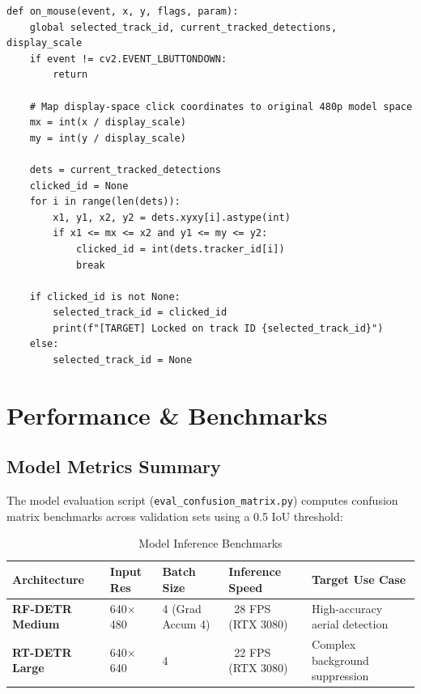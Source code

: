 \documentclass[11pt,a4paper]{article}
\begin{document}
\begin{lstlisting}[caption={Interactive Target Selection Callback (\texttt{demo.py})}]
def on_mouse(event, x, y, flags, param):
    global selected_track_id, current_tracked_detections, display_scale
    if event != cv2.EVENT_LBUTTONDOWN:
        return

    # Map display-space click coordinates to original 480p model space
    mx = int(x / display_scale)
    my = int(y / display_scale)

    dets = current_tracked_detections
    clicked_id = None
    for i in range(len(dets)):
        x1, y1, x2, y2 = dets.xyxy[i].astype(int)
        if x1 <= mx <= x2 and y1 <= my <= y2:
            clicked_id = int(dets.tracker_id[i])
            break

    if clicked_id is not None:
        selected_track_id = clicked_id
        print(f"[TARGET] Locked on track ID {selected_track_id}")
    else:
        selected_track_id = None
\end{lstlisting}

\newpage

\section{Performance \& Benchmarks}

\subsection{Model Metrics Summary}
The model evaluation script (\texttt{eval\_confusion\_matrix.py}) computes confusion matrix benchmarks across validation sets using a 0.5 IoU threshold:

\begin{table}[H]
    \centering
    \begin{tabular}{@{}lllll@{}}
        \toprule
        \textbf{Architecture} & \textbf{Input Res} & \textbf{Batch Size} & \textbf{Inference Speed} & \textbf{Target Use Case} \\
        \midrule
        \textbf{RF-DETR Medium} & 640$\times$480 & 4 (Grad Accum 4) & ~28 FPS (RTX 3080) & High-accuracy aerial detection \\
        \textbf{RT-DETR Large} & 640$\times$640 & 4 & ~22 FPS (RTX 3080) & Complex background suppression \\
        \bottomrule
    \end{tabular}
    \caption{Model Inference Benchmarks}
\end{table}
\end{document}
